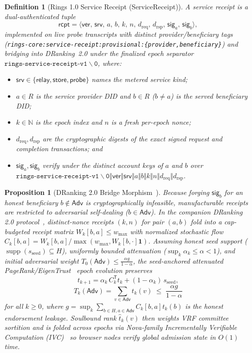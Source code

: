 \documentclass[journal]{IEEEtran}
\newtheorem{definition}{Definition}
\newtheorem{proposition}{Proposition}
\DeclareRobustCommand{\code}[1]{{\ttfamily\renewcommand{\_}{\textunderscore\allowbreak}#1}}
\begin{document}
\begin{definition}[Rings 1.0 Service Receipt (\code{ServiceReceipt})]\label{def:service-receipt}
A service receipt is a dual-authenticated tuple
\[
  \mathsf{rcpt}=\bigl\langle\mathsf{ver},\,\mathsf{srv},\,a,\,b,\,k,\,n,\,d_{\mathrm{req}},\,d_{\mathrm{rsp}},\,\mathsf{sig}_a,\,\mathsf{sig}_b\bigr\rangle,
\]
implemented on live probe transcripts with distinct provider/beneficiary tags (\texttt{rings-core:\allowbreak service-receipt:\allowbreak provisional:\allowbreak\{provider,\allowbreak beneficiary\}}) and bridging into DRanking~2.0 under the finalized epoch separator $\mathtt{rings\mbox{-}service\mbox{-}receipt\mbox{-}v1\backslash 0}$, where:
\begin{itemize}[leftmargin=1.5em]
\item $\mathsf{srv}\in\{\mathsf{relay},\mathsf{store},\mathsf{probe}\}$ names the metered service kind;
\item $a\in R$ is the service provider DID and $b\in R$ ($b\neq a$) is the served beneficiary DID;
\item $k\in\mathbb{N}$ is the epoch index and $n$ is a fresh per-epoch nonce;
\item $d_{\mathrm{req}},d_{\mathrm{rsp}}$ are the cryptographic digests of the exact signed request and completion transactions; and
\item $\mathsf{sig}_a,\mathsf{sig}_b$ verify under the distinct account keys of $a$ and $b$ over $\mathtt{rings\mbox{-}service\mbox{-}receipt\mbox{-}v1\backslash 0}\Vert\allowbreak\mathsf{ver}\Vert\allowbreak\mathsf{srv}\Vert\allowbreak a\Vert b\Vert k\Vert n\Vert d_{\mathrm{req}}\Vert d_{\mathrm{rsp}}$.
\end{itemize}
\end{definition}

\begin{proposition}[DRanking 2.0 Bridge Morphism~\cite{RingsDRanking2026}]\label{prop:dranking-bridge}
Because forging $\mathsf{sig}_b$ for an honest beneficiary $b\notin\mathsf{Adv}$ is
cryptographically infeasible, manufacturable receipts are restricted to
adversarial self-dealing ($b\in\mathsf{Adv}$).  In the companion DRanking 2.0
protocol~\cite{RingsDRanking2026}, distinct-nonce receipts $(k,n)$ for pair $(a,b)$
fold into a cap-budgeted
receipt matrix $W_k[b,a]\le w_{\max}$ with normalized stochastic flow
$C_k[b,a]=W_k[b,a]/\max(w_{\max},W_k[b,\cdot]\mathbf{1})$. Assuming honest seed
support ($\operatorname{supp}(s_{\mathrm{seed}})\subseteq H$), uniformly bounded attenuation
($\sup_k\alpha_k\le\alpha<1$), and initial adversarial weight
$T_0(\mathsf{Adv})\le\frac{\alpha g}{1-\alpha}$, the
seed-anchored attenuated PageRank/EigenTrust~\cite{PageRank,EigenTrust} epoch
evolution preserves
\[
  t_{k+1}=\alpha_k\,C_k^{\mathsf{T}}t_k+(1-\alpha_k)\,s_{\mathrm{seed}},
\]
\[
  T_k(\mathsf{Adv})=\sum_{v\in\mathsf{Adv}}t_k(v)\;\le\;\frac{\alpha g}{1-\alpha}
\]
for all $k\ge 0$,
where $g=\sup_k\sum_{b\in H,a\in\mathsf{Adv}}C_k[b,a]t_k(b)$ is the honest
endorsement leakage.  Soulbound rank $\hat{t}_k(v)$ then weights VRF committee
sortition and is folded across epochs via Nova-family Incrementally Verifiable
Computation (IVC)~\cite{Nova} so browser nodes verify global admission state in
$O(1)$ time.
\end{proposition}
\end{document}

